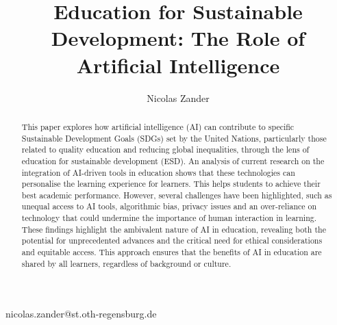 \documentclass[]{lni}
\begin{document}
\title[]{Education for Sustainable Development: The Role of Artificial Intelligence}

\author[1]{Nicolas Zander}{nicolas.zander@st.oth-regensburg.de}{}

\maketitle

\begin{abstract}

This paper explores how artificial intelligence (AI) can contribute to specific Sustainable Development Goals (SDGs) set by the United Nations, 
particularly those related to quality education and reducing global inequalities, through the lens of education for sustainable development (ESD).
An analysis of current research on the integration of AI-driven tools in education shows that these technologies can personalise the learning experience for learners. 
This helps students to achieve their best academic performance. However, several challenges have been highlighted,
such as unequal access to AI tools, algorithmic bias, privacy issues and an over-reliance on technology that could undermine the importance of human interaction in learning. 
These findings highlight the ambivalent nature of AI in education, revealing both the potential for unprecedented advances and the critical need for ethical considerations and
equitable access. This approach ensures that the benefits of AI in education are shared by all learners, regardless of background or culture.
\end{abstract}



\end{document}
